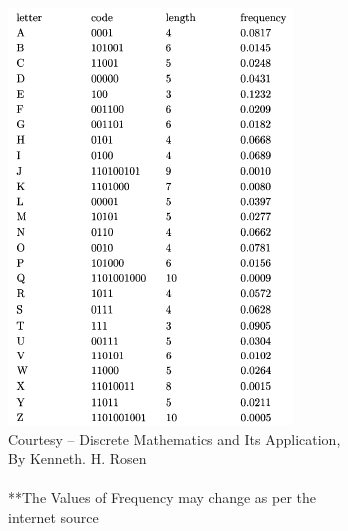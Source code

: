 \documentclass{article}
\begin{document}
\begin{figure}[ht]
\centering
\begin{subfigure}{.6\textwidth}
  \centering
  \includegraphics[width=1\linewidth]{P1.png}
  \caption{Courtesy – Discrete Mathematics and Its Application, By Kenneth. H. Rosen \\ \\
  **The Values of Frequency may change as per the internet source  }
  \label{fig:sub1}
\end{subfigure}%
\begin{subfigure}{.38\textwidth}
  \centering

\end{subfigure}
\end{figure}
\end{document}
